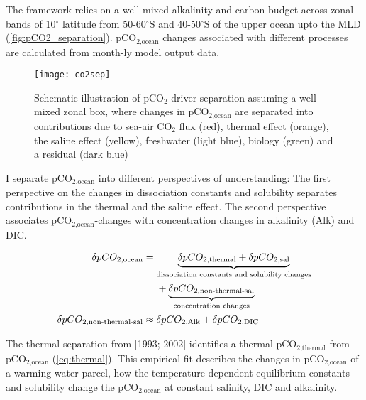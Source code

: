 The framework relies on a well-mixed alkalinity and carbon budget across zonal bands of 10$^\circ$ latitude from 50-60$^\circ$S and 40-50$^\circ$S of the upper ocean upto the \acf{MLD} (\autoref{fig:pCO2_separation}). pCO$_{\text{2,ocean}}$ changes associated with different processes are calculated from month-ly model output data.\newline

\begin{figure}[hbt]
	\centering
	\texttt{[image: co2sep]}
	\caption{Schematic illustration of pCO$_2$ driver separation assuming a well-mixed zonal box, where changes in pCO$_{\text{2,ocean}}$ are separated into contributions due to sea-air CO$_2$ flux (red), thermal effect (orange), the saline effect (yellow), freshwater (light blue), biology (green) and a residual (dark blue)}	
	\label{fig:pCO2_separation}
\end{figure}

I separate pCO$_{\text{2,ocean}}$ into different perspectives of understanding: The first perspective on the changes in dissociation constants and solubility separates contributions in the thermal and the saline effect. The second perspective associates pCO$_{\text{2,ocean}}$-changes with concentration changes in alkalinity (Alk) and \acs{DIC}. 

\begin{align}
\allowdisplaybreaks
\delta pCO_{\text{2,ocean}}&=\underbrace{\delta pCO_{\text{2,thermal}}+\delta pCO_{\text{2,sal}}}_{\text{dissociation constants and solubility changes}} \notag \\
&\phantom{{}={}} +\underbrace{\delta pCO_{\text{2,non-thermal-sal}}}_{\text{concentration changes}}  \\
\delta pCO_{\text{2,non-thermal-sal}}&\approx \delta pCO_{\text{2,Alk}}+\delta pCO_{\text{2,DIC}}
\end{align}

The thermal separation from \citeauthor{Takahashi1993} [{\color{RoyalBlue}1993};  {\color{RoyalBlue}2002}] identifies a thermal pCO$_{\text{2,thermal}}$ from pCO$_{\text{2,ocean}}$ (\autoref{eq:thermal}). This empirical fit describes the changes in pCO$_{\text{2,ocean}}$ of a warming water parcel, \ie how the temperature-dependent equilibrium constants and solubility change the pCO$_{\text{2,ocean}}$ at constant salinity, \acs{DIC} and alkalinity. 

